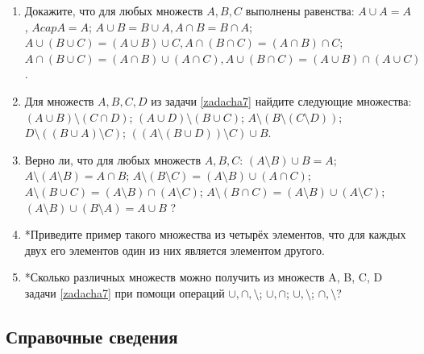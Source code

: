 \begin{enumerate}
\item  Докажите, что для любых множеств $A, B, C$ выполнены равенства:
\ipunkt $A \cup A = A$, $A cap A = A$;
\ipunkt $A \cup B = B \cup A, A \cap B = B \cap A$;
\ipunkt $A \cup (B \cup C) = (A \cup B) \cup C, A \cap (B \cap C) = (A \cap B) \cap C$;
\ipunkt $A \cap (B \cup C) = (A \cap B) \cup (A \cap C), A \cup (B \cap C) = (A \cup B) \cap (A \cup C)$.

\item Для множеств $A, B, C, D$ из задачи \ref{zadacha7} найдите следующие множества:
\ipunkt $(A \cup B)\setminus (C \cap D)$;
\ipunkt $(A \cup D)\setminus (B \cup C)$;
\ipunkt $A\setminus(B\setminus(C\setminus D))$;
\ipunkt $D\setminus ((B \cup A)\setminus C)$;
\ipunkt $((A\setminus (B \cup D))\setminus C) \cup B$.

\item Верно ли, что для любых множеств $A, B, C$:
\ipunkt $(A\setminus B) \cup B = A$;
\ipunkt $A\setminus (A\setminus B) = A \cap B$;
\ipunkt $A\setminus (B\setminus C) = (A\setminus B) \cup (A \cap C)$;
\ipunkt $A\setminus (B \cup C) = (A\setminus B) \cap (A\setminus C)$;
\ipunkt $A\setminus (B \cap C) = (A\setminus B) \cup (A\setminus C)$;
\ipunkt $(A\setminus B) \cup (B\setminus A) = A \cup B$ ?


\item *Приведите пример такого множества из четырёх элементов, что для каждых двух его
элементов один из них является элементом другого.

\item *Сколько различных множеств можно получить из множеств A, B, C, D задачи \ref{zadacha7} при
помощи операций \ipunkt $\cup, \cap, \setminus$;
\ipunkt $\cup, \cap$;
\ipunkt $\cup, \setminus$;
\ipunkt $\cap, \setminus$?


\end{enumerate}

\subsection*{Справочные сведения}


